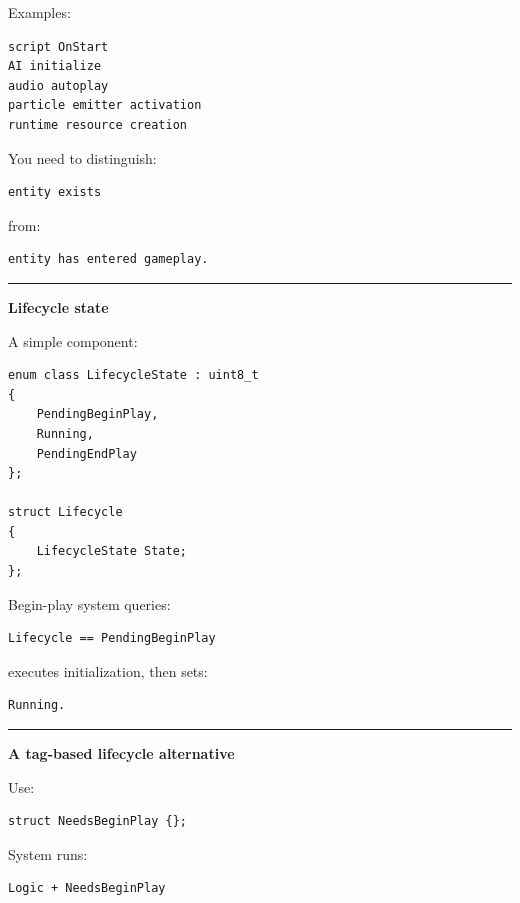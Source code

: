 Examples:

\begin{verbatim}
script OnStart
AI initialize
audio autoplay
particle emitter activation
runtime resource creation
\end{verbatim}

You need to distinguish:

\begin{verbatim}
entity exists
\end{verbatim}

from:

\begin{verbatim}
entity has entered gameplay.
\end{verbatim}

\begin{center}\rule{0.5\linewidth}{0.5pt}\end{center}

\textbf{Lifecycle state}

A simple component:

\begin{verbatim}
enum class LifecycleState : uint8_t
{
    PendingBeginPlay,
    Running,
    PendingEndPlay
};

struct Lifecycle
{
    LifecycleState State;
};
\end{verbatim}

Begin-play system queries:

\begin{verbatim}
Lifecycle == PendingBeginPlay
\end{verbatim}

executes initialization, then sets:

\begin{verbatim}
Running.
\end{verbatim}

\begin{center}\rule{0.5\linewidth}{0.5pt}\end{center}

\textbf{A tag-based lifecycle alternative}

Use:

\begin{verbatim}
struct NeedsBeginPlay {};
\end{verbatim}

System runs:

\begin{verbatim}
Logic + NeedsBeginPlay
\end{verbatim}

